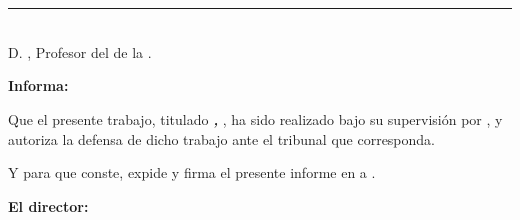 




\chapter*{}
\thispagestyle{empty}

\noindent\rule[-1ex]{\textwidth}{2pt}\\[4.5ex]

D. \textbf{\myProf}, Profesor del \myDepartment de la \myUni.

\vspace{0.5cm}

\textbf{Informa:}

\vspace{0.5cm}

Que el presente trabajo, titulado \textit{\textbf{\myTitle, \mySubtitle}}, ha sido realizado bajo su supervisión por \textbf{\myName}, y autoriza la defensa de dicho trabajo ante el tribunal que corresponda.

\vspace{0.5cm}

Y para que conste, expide y firma el presente informe en \myLocation a \myTime.

\vspace{1cm}

\textbf{El director:}

\vspace{5cm}

\noindent \textbf{\myProf}


\dedication{A mi historiadora del arte}
